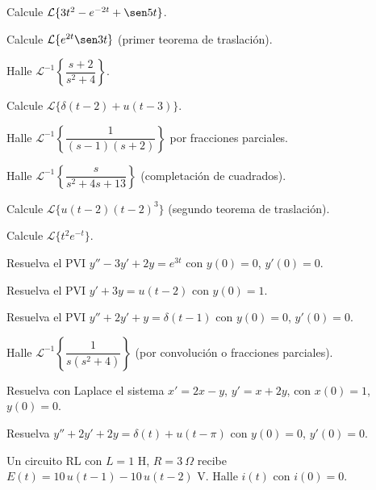 \begin{prob}
Calcule $\mathcal{L}\{3t^2 - e^{-2t} + \sen 5t\}$.
\end{prob}

\begin{prob}
Calcule $\mathcal{L}\{e^{2t}\sen 3t\}$ (primer teorema de traslación).
\end{prob}

\begin{prob}
Halle $\mathcal{L}^{-1}\left\{\dfrac{s+2}{s^2+4}\right\}$.
\end{prob}

\begin{prob}
Calcule $\mathcal{L}\{\delta(t-2)+u(t-3)\}$.
\end{prob}

\begin{prob}
Halle $\mathcal{L}^{-1}\left\{\dfrac{1}{(s-1)(s+2)}\right\}$ por fracciones parciales.
\end{prob}

\begin{prob}
Halle $\mathcal{L}^{-1}\left\{\dfrac{s}{s^2+4s+13}\right\}$ (completación de cuadrados).
\end{prob}

\begin{prob}
Calcule $\mathcal{L}\{u(t-2)(t-2)^3\}$ (segundo teorema de traslación).
\end{prob}

\begin{prob}
Calcule $\mathcal{L}\{t^2 e^{-t}\}$.
\end{prob}

\begin{prob}
Resuelva el PVI $y'' - 3y' + 2y = e^{3t}$ con $y(0)=0$, $y'(0)=0$.
\end{prob}

\begin{prob}
Resuelva el PVI $y' + 3y = u(t-2)$ con $y(0)=1$.
\end{prob}

\begin{prob}
Resuelva el PVI $y'' + 2y' + y = \delta(t-1)$ con $y(0)=0$, $y'(0)=0$.
\end{prob}

\begin{prob}
Halle $\mathcal{L}^{-1}\left\{\dfrac{1}{s(s^2+4)}\right\}$ (por convolución o fracciones parciales).
\end{prob}

\begin{prob}
Resuelva con Laplace el sistema $x'=2x-y$, $y'=x+2y$, con $x(0)=1$, $y(0)=0$.
\end{prob}

\begin{prob}
Resuelva $y'' + 2y' + 2y = \delta(t) + u(t-\pi)$ con $y(0)=0$, $y'(0)=0$.
\end{prob}

\begin{prob}
Un circuito RL con $L=1$ H, $R=3\ \Omega$ recibe $E(t)=10\,u(t-1)-10\,u(t-2)$ V. Halle $i(t)$ con $i(0)=0$.
\end{prob}
